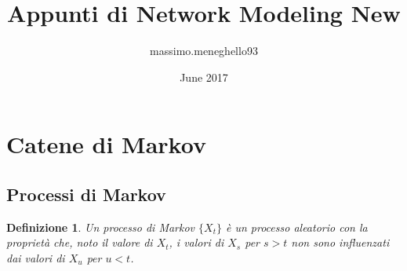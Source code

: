 \documentclass{article}
\title{Appunti di Network Modeling New}
\author{massimo.meneghello93}
\date{June 2017}
\newtheorem{definizione}{Definizione}[section]
\begin{document}
\maketitle
\tableofcontents
\newpage

\section{Catene di Markov}


\subsection{Processi di Markov}

\begin{definizione}
Un processo di Markov $\{X_t\}$ è un processo aleatorio con la proprietà che, noto il valore di $X_t$, i valori di $X_s$ per $s > t$ non sono influenzati dai valori di $X_u$ per $u < t$.
\end{definizione}
\end{document}
